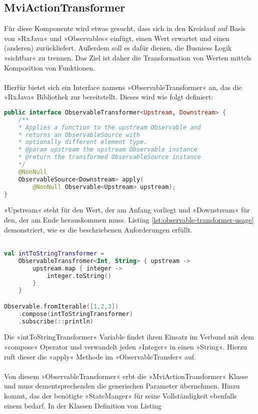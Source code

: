 \subsection{MviActionTransformer}
Für diese Komponente wird etwas gesucht, dass sich in den Kreislauf auf Basis von »RxJava« und »Observables« einfügt, einen Wert erwartet und einen (anderen) zurückliefert. Außerdem soll es dafür dienen, die Busniess Logik »sichtbar« zu trennen. Das Ziel ist daher die Transformation von Werten mittels Komposition von Funktionen.
\\\\
Hierfür bietet sich ein Interface namens »ObservableTransformer« an, das die »RxJava« Bibliothek zur bereitstellt. Dieses wird wie folgt definiert:
\begin{lstlisting}[caption={ObservableTransformer}, label={lst:observable-transformer}, language=Kotlin]
public interface ObservableTransformer<Upstream, Downstream> {
	/**
	* Applies a function to the upstream Observable and 
	* returns an ObservableSource with
	* optionally different element type.
	* @param upstream the upstream Observable instance
	* @return the transformed ObservableSource instance
	*/
	@NonNull
	ObservableSource<Downstream> apply(
		@NonNull Observable<Upstream> upstream);
}
\end{lstlisting}
»Upstream« steht für den Wert, der am Anfang vorliegt und »Downstream« für den, der am Ende herauskommen muss. Listing
\ref{lst:observable-transformer-usage}
demonstriert, wie es die beschriebenen Anforderungen erfüllt.
\begin{lstlisting}[caption={ObservableTransformer Anwendung}, label={lst:observable-transformer-usage}, language=Kotlin]

val intToStringTransformer = 
	ObservableTransfromer<Int, String> { upstream ->
		upstream.map { integer ->
			integer.toString()
		}
	}

Observable.fromIterable([1,2,3])
	.compose(intToStringTransformer)
	.subscribe(::println)
\end{lstlisting}
\bigskip
Die »intToStringTransformer« Variable findet ihren Einsatz im Verbund mit dem »compose« Operator und verwandelt jeden »Integer« in einen »String«. Hierzu ruft dieser die »apply« Methode im »ObservableTransfer« auf.
\\\\
Von diesem »ObservableTransformer« erbt die »MviActionTransformer« Klasse und muss dementsprechenden die generischen Parameter übernehmen. Hinzu kommt, das der benötigte »StateManger« für seine Vollständigkeit ebenfalls einem bedarf. In der Klassen Definition von Listing
